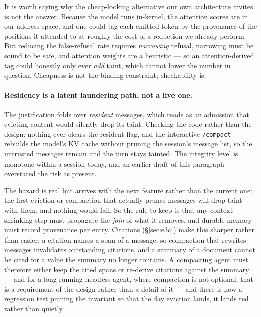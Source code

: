 \documentclass[11pt]{article}
\newcommand{\code}[1]{\texttt{#1}}
\begin{document}
It is worth saying why the cheap-looking alternative our own architecture invites
is not the answer. Because the model runs in-kernel, the attention scores are in
our address space, and one could tag each emitted token by the provenance of the
positions it attended to at roughly the cost of a reduction we already perform.
But reducing the false-refusal rate requires \emph{narrowing} refusal, narrowing
must be sound to be safe, and attention weights are a heuristic --- so an
attention-derived tag could honestly only ever \emph{add} taint, which cannot
lower the number in question. Cheapness is not the binding constraint;
checkability is.

\paragraph{Residency is a latent laundering path, not a live one.} The
justification folds over \emph{resident} messages, which reads as an admission
that evicting content would silently drop its taint. Checking the code rather
than the design: nothing ever clears the resident flag, and the interactive
\code{/compact} rebuilds the model's KV cache without pruning the session's
message list, so the untrusted messages remain and the turn stays tainted. The
integrity level is monotone within a session today, and an earlier draft of this
paragraph overstated the risk as present.

The hazard is real but arrives with the next feature rather than the current
one: the first eviction or compaction that actually prunes messages will drop
taint with them, and nothing would fail. So the rule to keep is that any
context-shrinking step must propagate the \emph{join} of what it removes, and
durable memory must record provenance per entry. Citations (\S\ref{sec:e3c})
make this sharper rather than easier: a citation names a span of a message, so
compaction that rewrites messages invalidates outstanding citations, and a
summary of a document cannot be cited for a value the summary no longer contains.
A compacting agent must therefore either keep the cited spans or re-derive
citations against the summary --- and for a long-running headless agent, where
compaction is not optional, that is a requirement of the design rather than a
detail of it --- and there is now a
regression test pinning the invariant so that the day eviction lands, it lands
red rather than quietly.
\end{document}
